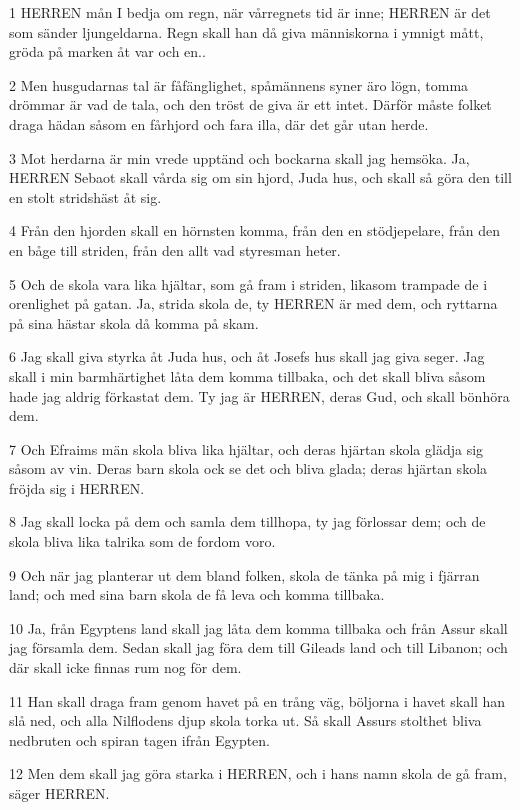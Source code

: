 \par 1 HERREN mån I bedja om regn, när vårregnets tid är inne; HERREN är det som sänder ljungeldarna. Regn skall han då giva människorna i ymnigt mått, gröda på marken åt var och en..
\par 2 Men husgudarnas tal är fåfänglighet, spåmännens syner äro lögn, tomma drömmar är vad de tala, och den tröst de giva är ett intet. Därför måste folket draga hädan såsom en fårhjord och fara illa, där det går utan herde.
\par 3 Mot herdarna är min vrede upptänd och bockarna skall jag hemsöka. Ja, HERREN Sebaot skall vårda sig om sin hjord, Juda hus, och skall så göra den till en stolt stridshäst åt sig.
\par 4 Från den hjorden skall en hörnsten komma, från den en stödjepelare, från den en båge till striden, från den allt vad styresman heter.
\par 5 Och de skola vara lika hjältar, som gå fram i striden, likasom trampade de i orenlighet på gatan. Ja, strida skola de, ty HERREN är med dem, och ryttarna på sina hästar skola då komma på skam.
\par 6 Jag skall giva styrka åt Juda hus, och åt Josefs hus skall jag giva seger. Jag skall i min barmhärtighet låta dem komma tillbaka, och det skall bliva såsom hade jag aldrig förkastat dem. Ty jag är HERREN, deras Gud, och skall bönhöra dem.
\par 7 Och Efraims män skola bliva lika hjältar, och deras hjärtan skola glädja sig såsom av vin. Deras barn skola ock se det och bliva glada; deras hjärtan skola fröjda sig i HERREN.
\par 8 Jag skall locka på dem och samla dem tillhopa, ty jag förlossar dem; och de skola bliva lika talrika som de fordom voro.
\par 9 Och när jag planterar ut dem bland folken, skola de tänka på mig i fjärran land; och med sina barn skola de få leva och komma tillbaka.
\par 10 Ja, från Egyptens land skall jag låta dem komma tillbaka och från Assur skall jag församla dem. Sedan skall jag föra dem till Gileads land och till Libanon; och där skall icke finnas rum nog för dem.
\par 11 Han skall draga fram genom havet på en trång väg, böljorna i havet skall han slå ned, och alla Nilflodens djup skola torka ut. Så skall Assurs stolthet bliva nedbruten och spiran tagen ifrån Egypten.
\par 12 Men dem skall jag göra starka i HERREN, och i hans namn skola de gå fram, säger HERREN.

